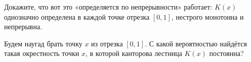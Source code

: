 \documentclass[a4paper,12pt]{article}
\begin{document}
Докажите, что вот это «определяется по непрерывности» работает: $K(x)$ однозначно определена в каждой точке отрезка $[0, 1]$, нестрого монотонна и непрерывна.


Будем наугад брать точку $x$ из отрезка $[0, 1]$.
С какой вероятностью найдётся такая окрестность точки $x$, в которой канторова лестница $K(x)$ постоянна?


\end{document}
